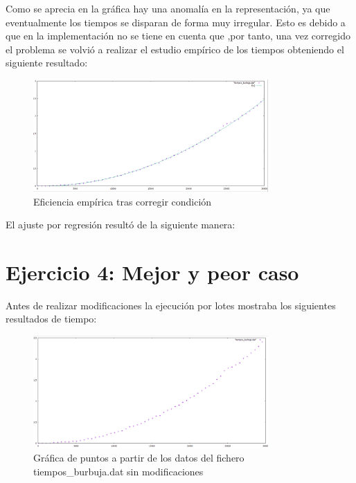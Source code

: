 \documentclass[paper=a4, fontsize=10pt]{scrartcl} %
\begin{document}
Como se aprecia en la gráfica hay una anomalía en la representación, ya que eventualmente los tiempos se disparan de forma muy irregular. Esto es debido a que en la implementación no se tiene en cuenta que 
,por tanto, una vez corregido el problema se volvió a realizar el estudio empírico de los tiempos obteniendo el siguiente resultado:

\begin{figure}[H] %
	\centering
	\label{lsblk}
	\includegraphics[width=0.8\textwidth]{../imgs/c3.PNG}
	\caption{Eficiencia empírica tras corregir condición} 
\end{figure}

El ajuste por regresión resultó de la siguiente manera:


\section{Ejercicio 4:  Mejor y peor caso}
Antes de realizar modificaciones la ejecución por lotes mostraba los siguientes resultados de tiempo:

\begin{figure}[H] %
	\centering
	\label{lsblk}
	\includegraphics[width=0.8\textwidth]{../imgs/c1.PNG}
	\caption{Gráfica de puntos a partir de los datos del fichero tiempos\_burbuja.dat sin modificaciones} 
\end{figure}
\end{document}

